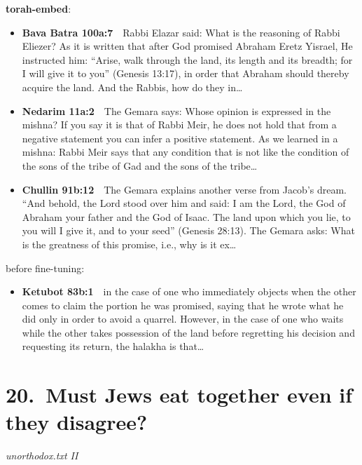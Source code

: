 \documentclass[11pt,a4paper]{article}
\begin{document}
{\color{quiet}\small\textbf{torah-embed}:}
\begin{itemize}[leftmargin=1.2em,itemsep=3pt]
\item {\color{ref}\textbf{Bava Batra 100a:7}}\ \ Rabbi Elazar said: What is the reasoning of Rabbi Eliezer? As it is written that after God promised Abraham Eretz Yisrael, He instructed him: “Arise, walk through the land, its length and its breadth; for I will give it to you” (Genesis 13:17), in order that Abraham should thereby acquire the land. And the Rabbis, how do they in\ldots
\item {\color{ref}\textbf{Nedarim 11a:2}}\ \ The Gemara says: Whose opinion is expressed in the mishna? If you say it is that of Rabbi Meir, he does not hold that from a negative statement you can infer a positive statement. As we learned in a mishna: Rabbi Meir says that any condition that is not like the condition of the sons of the tribe of Gad and the sons of the tribe\ldots
\item {\color{ref}\textbf{Chullin 91b:12}}\ \ The Gemara explains another verse from Jacob’s dream. “And behold, the Lord stood over him and said: I am the Lord, the God of Abraham your father and the God of Isaac. The land upon which you lie, to you will I give it, and to your seed” (Genesis 28:13). The Gemara asks: What is the greatness of this promise, i.e., why is it ex\ldots
\end{itemize}
{\color{quiet}\small before fine-tuning:}
\begin{itemize}[leftmargin=1.2em]
\item {\color{ref}\textbf{Ketubot 83b:1}}\ \ in the case of one who immediately objects when the other comes to claim the portion he was promised, saying that he wrote what he did only in order to avoid a quarrel. However, in the case of one who waits while the other takes possession of the land before regretting his decision and requesting its return, the halakha is that\ldots
\end{itemize}

\section*{20.\ Must Jews eat together even if they disagree?}
{\color{quiet}\small\textit{unorthodox.txt II}}
\end{document}
